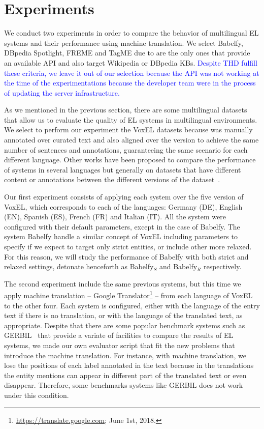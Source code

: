 \documentclass{llncs}
\begin{document}
\section{Experiments}

We conduct two experiments in order to compare the behavior of multilingual EL systems and their performance using machine translation. We select Babelfy, DBpedia Spotlight, FREME and TagME due to are the only ones that provide an available API and also target Wikipedia or DBpedia KBs. \textcolor{blue}{Despite THD fulfill these criteria, we leave it out of our selection because the API was not working at the time of the experimentations because the developer team were in the process of updating the server infrastructure.} 

As we mentioned in the previous section, there are some multilingual datasets that allow us to evaluate the quality of EL systems in multilingual environments. We select to perform our experiment the VoxEL datasets because was manually annotated over curated text and also aligned over the version to achieve the same number of sentences and annotations, guaranteeing the same scenario for each different language. Other works have been proposed to compare the performance of systems in several languages but generally on datasets that have different content or annotations between the different versions of the dataset~\cite{ourLD4ID2017}.

Our first experiment consists of applying each system over the five version of VoxEL, which corresponds to each of the languages: Germany (DE), English (EN), Spanish (ES), French (FR) and Italian (IT). All the system were configured with their default parameters, except in the case of Babelfy. The system Babelfy handle a similar concept of VoxEL including parameters to specify if we expect to target only strict entities, or include other more relaxed. For this reason, we will study the performance of Babelfy with both strict and relaxed settings, detonate henceforth as Babelfy$_S$ and Babelfy$_R$ respectively.

The second experiment include the same previous systems, but this time we apply machine translation -- Google Translator\footnote{\url{https://translate.google.com}; June 1st, 2018.} -- from each language of VoxEL to the other four. Each system is configured, either with the language of the entry text if there is no translation, or with the language of the translated text, as appropriate. Despite that there are some popular benchmark systems such as GERBIL~\cite{gerbil2015} that provide a variate of facilities to compare the results of EL systems, we made our own evaluator script that fit the new problems that introduce the machine translation. For instance, with machine translation, we lose the positions of each label annotated in the text because in the translations the entity mentions can appear in different part of the translated text or even disappear. Therefore, some benchmarks systems like GERBIL does not work under this condition. 
\end{document}
